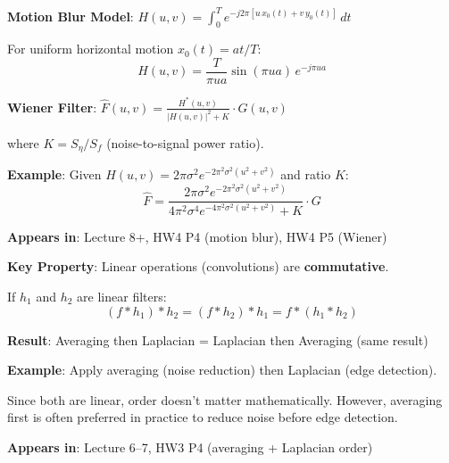 \documentclass[10pt]{article}
\begin{document}
\begin{conceptbox}

\begin{formulabox}
\textbf{Motion Blur Model}: $H(u,v) = \int_0^T e^{-j2\pi[u\,x_0(t) + v\,y_0(t)]}\,dt$

For uniform horizontal motion $x_0(t) = at/T$:
\[
H(u,v) = \frac{T}{\pi u a}\sin(\pi u a)\,e^{-j\pi u a}
\]

\textbf{Wiener Filter}: $\hat{F}(u,v) = \frac{H^*(u,v)}{|H(u,v)|^2 + K} \cdot G(u,v)$

where $K = S_\eta/S_f$ (noise-to-signal power ratio).
\end{formulabox}

\begin{examplebox}
\textbf{Example}: Given $H(u,v) = 2\pi\sigma^2 e^{-2\pi^2\sigma^2(u^2+v^2)}$ and ratio $K$:
\[
\hat{F} = \frac{2\pi\sigma^2 e^{-2\pi^2\sigma^2(u^2+v^2)}}{4\pi^2\sigma^4 e^{-4\pi^2\sigma^2(u^2+v^2)} + K} \cdot G
\]
\end{examplebox}

\textbf{Appears in}: Lecture 8+, HW4 P4 (motion blur), HW4 P5 (Wiener)

\end{conceptbox}


\begin{conceptbox}

\begin{formulabox}
\textbf{Key Property}: Linear operations (convolutions) are \textbf{commutative}.

If $h_1$ and $h_2$ are linear filters:
\[
(f * h_1) * h_2 = (f * h_2) * h_1 = f * (h_1 * h_2)
\]

\textbf{Result}: Averaging then Laplacian = Laplacian then Averaging (same result)
\end{formulabox}

\begin{examplebox}
\textbf{Example}: Apply averaging (noise reduction) then Laplacian (edge detection).

Since both are linear, order doesn't matter mathematically. However, averaging first is often preferred in practice to reduce noise before edge detection.
\end{examplebox}

\textbf{Appears in}: Lecture 6--7, HW3 P4 (averaging + Laplacian order)

\end{conceptbox}
\end{document}
